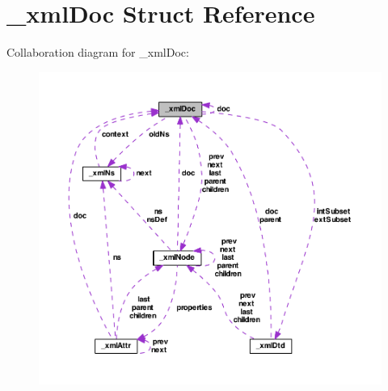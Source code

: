 \hypertarget{struct__xml_doc}{\section{\-\_\-xml\-Doc Struct Reference}
\label{struct__xml_doc}
}


Collaboration diagram for \-\_\-xml\-Doc\-:
\nopagebreak
\begin{figure}[H]
\begin{center}
\leavevmode
\includegraphics[width=350pt]{struct__xml_doc__coll__graph}
\end{center}
\end{figure}
